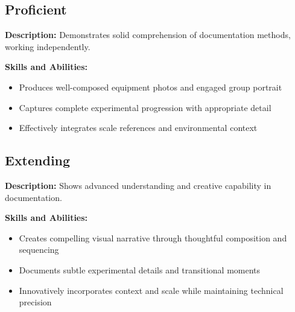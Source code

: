 \documentclass[11pt]{article}
\begin{document}
\subsection*{Proficient}
\textbf{Description:} Demonstrates solid comprehension of documentation methods, working independently.

\noindent\textbf{Skills and Abilities:}
\begin{itemize}[leftmargin=*]
    \item Produces well-composed equipment photos and engaged group portrait
    \item Captures complete experimental progression with appropriate detail
    \item Effectively integrates scale references and environmental context
\end{itemize}

\subsection*{Extending}
\textbf{Description:} Shows advanced understanding and creative capability in documentation.

\noindent\textbf{Skills and Abilities:}
\begin{itemize}[leftmargin=*]
    \item Creates compelling visual narrative through thoughtful composition and sequencing
    \item Documents subtle experimental details and transitional moments
    \item Innovatively incorporates context and scale while maintaining technical precision
\end{itemize}
\end{document}
